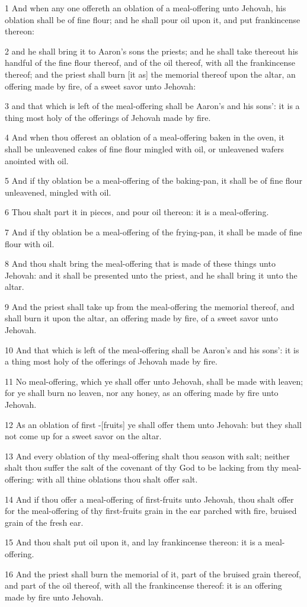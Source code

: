 \par 1 And when any one offereth an oblation of a meal-offering unto Jehovah, his oblation shall be of fine flour; and he shall pour oil upon it, and put frankincense thereon:
\par 2 and he shall bring it to Aaron's sons the priests; and he shall take thereout his handful of the fine flour thereof, and of the oil thereof, with all the frankincense thereof; and the priest shall burn [it as] the memorial thereof upon the altar, an offering made by fire, of a sweet savor unto Jehovah:
\par 3 and that which is left of the meal-offering shall be Aaron's and his sons': it is a thing most holy of the offerings of Jehovah made by fire.
\par 4 And when thou offerest an oblation of a meal-offering baken in the oven, it shall be unleavened cakes of fine flour mingled with oil, or unleavened wafers anointed with oil.
\par 5 And if thy oblation be a meal-offering of the baking-pan, it shall be of fine flour unleavened, mingled with oil.
\par 6 Thou shalt part it in pieces, and pour oil thereon: it is a meal-offering.
\par 7 And if thy oblation be a meal-offering of the frying-pan, it shall be made of fine flour with oil.
\par 8 And thou shalt bring the meal-offering that is made of these things unto Jehovah: and it shall be presented unto the priest, and he shall bring it unto the altar.
\par 9 And the priest shall take up from the meal-offering the memorial thereof, and shall burn it upon the altar, an offering made by fire, of a sweet savor unto Jehovah.
\par 10 And that which is left of the meal-offering shall be Aaron's and his sons': it is a thing most holy of the offerings of Jehovah made by fire.
\par 11 No meal-offering, which ye shall offer unto Jehovah, shall be made with leaven; for ye shall burn no leaven, nor any honey, as an offering made by fire unto Jehovah.
\par 12 As an oblation of first -[fruits] ye shall offer them unto Jehovah: but they shall not come up for a sweet savor on the altar.
\par 13 And every oblation of thy meal-offering shalt thou season with salt; neither shalt thou suffer the salt of the covenant of thy God to be lacking from thy meal-offering: with all thine oblations thou shalt offer salt.
\par 14 And if thou offer a meal-offering of first-fruits unto Jehovah, thou shalt offer for the meal-offering of thy first-fruits grain in the ear parched with fire, bruised grain of the fresh ear.
\par 15 And thou shalt put oil upon it, and lay frankincense thereon: it is a meal-offering.
\par 16 And the priest shall burn the memorial of it, part of the bruised grain thereof, and part of the oil thereof, with all the frankincense thereof: it is an offering made by fire unto Jehovah.


